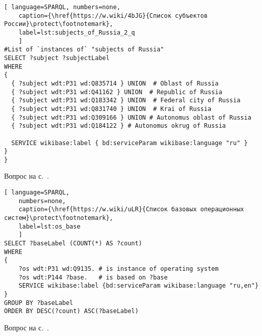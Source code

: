 \begin{task}
	\label{answer:subjects_of_Russia_2}
	
	\begin{lstlisting}[ language=SPARQL, numbers=none,
	caption={\href{https://w.wiki/4bJG}{Список субъектов России}\protect\footnotemark},
	label=lst:subjects_of_Russia_2_q
	]
#List of `instances of` "subjects of Russia" 
SELECT ?subject ?subjectLabel
WHERE
{
  { ?subject wdt:P31 wd:Q835714 } UNION  # Oblast of Russia
  { ?subject wdt:P31 wd:Q41162 } UNION  # Republic of Russia
  { ?subject wdt:P31 wd:Q183342 } UNION  # Federal city of Russia
  { ?subject wdt:P31 wd:Q831740 } UNION  # Krai of Russia
  { ?subject wdt:P31 wd:Q309166 } UNION # Autonomus oblast of Russia
  { ?subject wdt:P31 wd:Q184122 } # Autonomus okrug of Russia
  
  SERVICE wikibase:label { bd:serviceParam wikibase:language "ru" }
}
}
\end{lstlisting}
	
\small{Вопрос на с.~\pageref{lst:sharesBorderWith-empty-oblast-of-Russia}.}
\end{task}


\begin{task}
	\label{answer:os_base}

\begin{lstlisting}[ language=SPARQL, 
    numbers=none,
    caption={\href{https://w.wiki/uLR}{Список базовых операционных систем}\protect\footnotemark},
	label=lst:os_base
	]
SELECT ?baseLabel (COUNT(*) AS ?count)
WHERE
{
	?os wdt:P31 wd:Q9135. # is instance of operating system
	?os wdt:P144 ?base.   # is based on ?base
	SERVICE wikibase:label {bd:serviceParam wikibase:language "ru,en"}
}
GROUP BY ?baseLabel
ORDER BY DESC(?count) ASC(?baseLabel)\end{lstlisting}

\small{Вопрос на с.~\pageref{lst:base_of_operating_systems}.}
\end{task}

